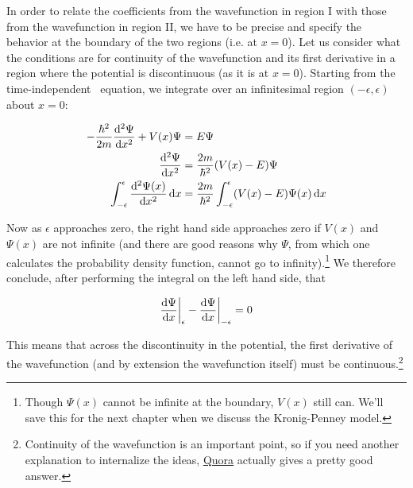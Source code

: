 In order to relate the coefficients from the wavefunction in region I with those from the wavefunction in region II, we have to be precise and specify the behavior at the boundary of the two regions (i.e. at $x = 0$). 
Let us consider what the conditions are for continuity of the wavefunction and its first derivative in a region where the potential is discontinuous (as it is at $x=0$). 
Starting from the time-independent \Sch\ equation, we integrate over an infinitesimal region $(-\epsilon, \epsilon)$ about $x = 0$:

\begin{align*}
	-\frac{\hbar^2}{2m} \dv[2]{\Psi}{x} + V(x)\Psi &= E\Psi \\
	\dv[2]{\Psi}{x} &= \frac{2m}{\hbar^2}(V(x) - E)\Psi \\
	\int_{-\epsilon}^{\epsilon} \dv[2]{\Psi(x)}{x} \dd{x} &= \frac{2m}{\hbar^2} \int_{-\epsilon}^{\epsilon} (V(x)-E)\Psi(x) \dd{x} 
\end{align*}

Now as $\epsilon$ approaches zero, the right hand side approaches zero if $V(x)$ and $\Psi(x)$ are not infinite (and there are good reasons why $\Psi$, from which one calculates the probability density function, cannot go to infinity).\footnote{Though $\Psi(x)$ cannot be infinite at the boundary, $V(x)$ still can. We'll save this for the next chapter when we discuss the Kronig-Penney model.} 
We therefore conclude, after performing the integral on the left hand side, that

\begin{tcolorbox}[title = Continuity of the wavefunction] \vspace{-2ex}
	\begin{equation}
		\dv{\Psi}{x} \bigg|_{\epsilon} - \dv{\Psi}{x} \bigg|_{-\epsilon} = 0 \label{eq:cont-dx}
	\end{equation}
\end{tcolorbox}

This means that across the discontinuity in the potential, the first derivative of the wavefunction (and by extension the wavefunction itself) must be continuous.\footnote{Continuity of the wavefunction is an important point, so if you need another explanation to internalize the ideas, \href{https://www.quora.com/Why-does-the-wave-function-have-to-be-continuous}{Quora} actually gives a pretty good answer.} 


